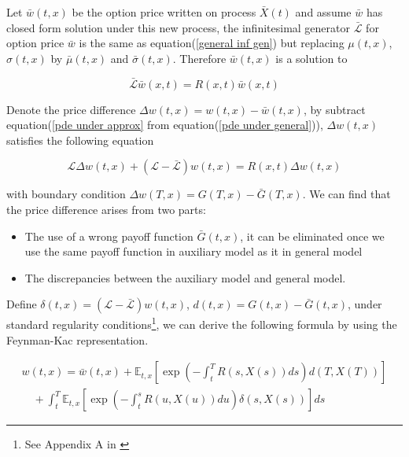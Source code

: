 Let $\bar{w}(t,x)$ be the option price written on process $\bar{X}(t)$ and assume $\bar{w}$ has closed form solution under this new process, the infinitesimal generator $\bar{\mathcal{L}}$ for option price $\bar{w}$ is the same as equation(\ref{general inf gen}) but replacing $\mu(t,x)$, $\sigma(t,x)$ by $\bar{\mu}(t,x)$ and $\bar{\sigma}(t,x)$. Therefore $\bar{w}(t,x)$ is a solution to

\begin{equation}\label{pde under approx}
    \mathcal{\bar{L}}\bar{w}(x,t) = R(x,t)\bar{w}(x,t)
\end{equation}

Denote the price difference $\Delta w(t,x) = w(t,x) - \bar{w}(t,x)$, by subtract equation(\ref{pde under approx} from equation(\ref{pde under general})), $\Delta w(t,x)$ satisfies the following equation

\begin{equation}
    \mathcal{L} \Delta w(t, x)+ (\mathcal{L}-\bar{\mathcal{L}}) w(t,x)=R(x, t) \Delta w(t, x)
\end{equation}

\noindent with boundary condition $\Delta w(T,x) = G(T,x) - \bar{G}(T,x)$. We can find that the price difference arises from two parts:

\begin{itemize}
    \item The use of a wrong payoff function $\bar{G}(t,x)$, it can be eliminated once we use the same payoff function in auxiliary model as it in general model
    \item The discrepancies between the auxiliary model and general model.
\end{itemize}

\noindent Define $\delta(t,x) = (\mathcal{L}-\bar{\mathcal{L}}) w(t,x)$, $d(t,x) = G(t,x) - \bar{G}(t,x)$, under standard regularity conditions\footnote{See Appendix A in \cite{kristensen_adding_2011}}, we can derive the following formula by using the Feynman-Kac representation. 

\begin{equation}\label{feynman-kac rep}
    \begin{gathered}
        w(t, x)=\bar{w}(t,x)+\mathbb{E}_{t,x}\left[\exp \left(-\int_{t}^{T} R(s,X(s)) d s\right) d(T,X(T))\right] \\
        \quad+\int_{t}^{T} \mathbb{E}_{t,x}\left[\exp \left(-\int_{t}^{s} R(u, X(u)) d u\right) \delta(s,X(s))\right] d s
        \end{gathered}
\end{equation}

